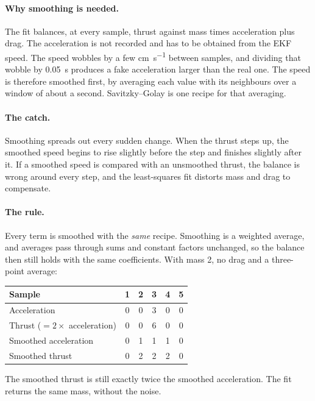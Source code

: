 \begin{revised}[title={Added 16 October 2026},breakable]
\paragraph{Why smoothing is needed.} The fit balances, at every sample, thrust against mass
times acceleration plus drag. The acceleration is not recorded and has to be obtained from the
EKF speed. The speed wobbles by a few \unit{\centi\meter\per\second} between samples, and
dividing that wobble by \qty{0.05}{\second} produces a fake acceleration larger than the real one.
The speed is therefore smoothed first, by averaging each value with its neighbours over a window
of about a second. Savitzky--Golay is one recipe for that averaging.

\paragraph{The catch.} Smoothing spreads out every sudden change. When the thrust steps up, the
smoothed speed begins to rise slightly before the step and finishes slightly after it. If a
smoothed speed is compared with an unsmoothed thrust, the balance is wrong around every step,
and the least-squares fit distorts mass and drag to compensate.

\paragraph{The rule.} Every term is smoothed with the \emph{same} recipe. Smoothing is a
weighted average, and averages pass through sums and constant factors unchanged, so the balance
then still holds with the same coefficients. With mass 2, no drag and a three-point average:
\begin{center}
\small
\begin{tabular}{@{}lccccc@{}}
\toprule
Sample & 1 & 2 & 3 & 4 & 5 \\
\midrule
Acceleration & 0 & 0 & 3 & 0 & 0 \\
Thrust ($= 2\times$ acceleration) & 0 & 0 & 6 & 0 & 0 \\
Smoothed acceleration & 0 & 1 & 1 & 1 & 0 \\
Smoothed thrust & 0 & 2 & 2 & 2 & 0 \\
\bottomrule
\end{tabular}
\end{center}
The smoothed thrust is still exactly twice the smoothed acceleration. The fit returns the same
mass, without the noise.


\end{revised}
